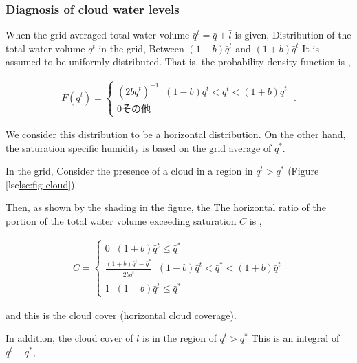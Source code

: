 \hypertarget{diagnosis-of-cloud-water-levels}{%
\subsubsection{Diagnosis of cloud water
levels}\label{diagnosis-of-cloud-water-levels}}

When the grid-averaged total water volume
\(\bar{q}^t = \bar{q} + \bar{l}\) is given, Distribution of the total
water volume \(q^t\) in the grid, Between \((1-b)\bar{q}^t\) and
\((1+b)\bar{q}^t\) It is assumed to be uniformly distributed. That is,
the probability density function is ,

\begin{eqnarray}
  F(q^t) = \left\{ 
           \begin{array}{ll}
             (2b\bar{q}^t)^{-1} \; \; 
                 (1-b)\bar{q}^t < q^t <  (1+b)\bar{q}^t \\
             0                         その他
           \end{array}
           \right. \; .
\end{eqnarray}

We consider this distribution to be a horizontal distribution. On the
other hand, the saturation specific humidity is based on the grid
average of \(\bar{q}^*\).

In the grid, Consider the presence of a cloud in a region in
\(q^t > q^*\) (Figure
{[}lsc\protect\hyperlink{lsc:fig-cloud}{lsc:fig-cloud{]}}).

Then, as shown by the shading in the figure, the The horizontal ratio of
the portion of the total water volume exceeding saturation \(C\) is ,

\begin{eqnarray}
  C = \left\{ 
           \begin{array}{ll}
             0 \; \;  (1+b)\bar{q}^t \leq \bar{q}^* \\
             \displaystyle
             \frac{(1+b)\bar{q}^t - \bar{q}^*}
                  {2b\bar{q}^t}                    
               \; \;  (1-b)\bar{q}^t < \bar{q}^* < (1+b)\bar{q}^t \\
             1 \; \;  (1-b)\bar{q}^t \leq \bar{q}^*
           \end{array}
        \right.
\end{eqnarray}

and this is the cloud cover (horizontal cloud coverage).

In addition, the cloud cover of \(l\) is in the region of \(q^t > q^*\)
This is an integral of \(q^t - q^*\),

